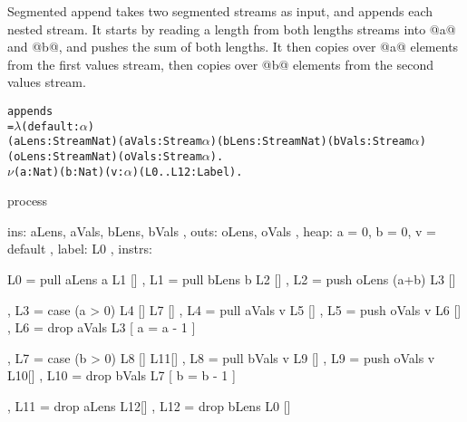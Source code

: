 \newpage

Segmented append takes two segmented streams as input, and appends each nested stream.
It starts by reading a length from both lengths streams into @a@ and @b@, and pushes the sum of both lengths.
It then copies over @a@ elements from the first values stream, then copies over @b@ elements from the second values stream.

\begin{alltt}
    appends 
        = \(\lambda\) (default : \(\alpha\))
            (aLens: Stream Nat) (aVals: Stream \(\alpha\)) (bLens: Stream Nat) (bVals: Stream \(\alpha\))
            (oLens: Stream Nat) (oVals: Stream \(\alpha\)).
          \(\nu\) (a : Nat) (b : Nat) (v: \(\alpha\)) (L0..L12: Label).
\end{alltt}
\begin{code}
         process
         { ins:    { aLens, aVals, bLens, bVals }
         , outs:   { oLens, oVals }
         , heap:   { a = 0, b = 0, v = default }
         , label:  L0
         , instrs: { L0  = pull aLens  a     L1 []
                   , L1  = pull bLens  b     L2 []
                   , L2  = push oLens (a+b)  L3 []

                   , L3  = case (a > 0)      L4 []  L7 []
                   , L4  = pull aVals v      L5 []
                   , L5  = push oVals v      L6 []
                   , L6  = drop aVals        L3 [ a = a - 1 ]

                   , L7  = case (b > 0)      L8 []  L11[]
                   , L8  = pull bVals v      L9 []
                   , L9  = push oVals v      L10[]
                   , L10 = drop bVals        L7 [ b = b - 1 ]

                   , L11 = drop aLens        L12[]
                   , L12 = drop bLens        L0 [] } }
\end{code}

